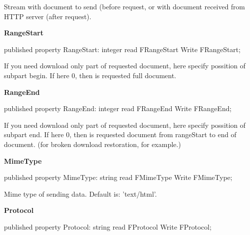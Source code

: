 \documentclass{report}
\newif\ifpdf
\begin{document}
\begin{list}{}
\begin{flushleft}
\ifpdf
\end{flushleft}
\fi


\par Stream with document to send (before request, or with document received from HTTP server (after request).\label{httpsend.THTTPSend-RangeStart}
\item[\textbf{RangeStart}\hfill]
\ifpdf
\begin{flushleft}
\fi
\begin{ttfamily}
published property RangeStart: integer read FRangeStart Write FRangeStart;\end{ttfamily}

\ifpdf
\end{flushleft}
\fi


\par If you need download only part of requested document, here specify possition of subpart begin. If here 0, then is requested full document.\label{httpsend.THTTPSend-RangeEnd}
\item[\textbf{RangeEnd}\hfill]
\ifpdf
\begin{flushleft}
\fi
\begin{ttfamily}
published property RangeEnd: integer read FRangeEnd Write FRangeEnd;\end{ttfamily}

\ifpdf
\end{flushleft}
\fi


\par If you need download only part of requested document, here specify possition of subpart end. If here 0, then is requested document from rangeStart to end of document. (for broken download restoration, for example.)\label{httpsend.THTTPSend-MimeType}
\item[\textbf{MimeType}\hfill]
\ifpdf
\begin{flushleft}
\fi
\begin{ttfamily}
published property MimeType: string read FMimeType Write FMimeType;\end{ttfamily}

\ifpdf
\end{flushleft}
\fi


\par Mime type of sending data. Default is: 'text/html'.\label{httpsend.THTTPSend-Protocol}
\item[\textbf{Protocol}\hfill]
\ifpdf
\begin{flushleft}
\fi
\begin{ttfamily}
published property Protocol: string read FProtocol Write FProtocol;\end{ttfamily}


\end{flushleft}
\end{list}
\end{document}
